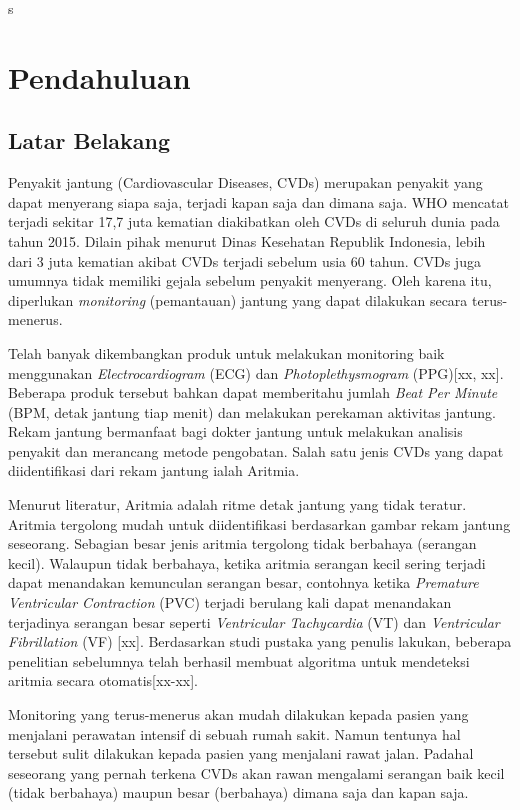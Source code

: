 s\chapter{Pendahuluan}
\section{Latar Belakang}
Penyakit jantung (Cardiovascular Diseases, CVDs) merupakan penyakit yang dapat menyerang siapa saja, terjadi kapan saja dan dimana saja. WHO mencatat terjadi sekitar 17,7 juta kematian diakibatkan oleh CVDs di seluruh dunia pada tahun 2015\cite{who2015facts}. Dilain pihak menurut Dinas Kesehatan Republik Indonesia, lebih dari 3 juta kematian akibat CVDs terjadi sebelum usia 60 tahun\cite{depkes2014}. CVDs juga umumnya tidak memiliki gejala sebelum penyakit menyerang\cite{who2015facts}. Oleh karena itu, diperlukan \textit{monitoring} (pemantauan) jantung yang dapat dilakukan secara terus-menerus.

Telah banyak dikembangkan produk untuk melakukan monitoring baik menggunakan \textit{Electrocardiogram} (ECG) dan \textit{Photoplethysmogram} (PPG)[xx, xx]. Beberapa produk tersebut bahkan dapat memberitahu jumlah \textit{Beat Per Minute} (BPM, detak jantung tiap menit) dan melakukan perekaman aktivitas jantung. Rekam jantung bermanfaat bagi dokter jantung untuk melakukan analisis penyakit dan merancang metode pengobatan. Salah satu jenis CVDs yang dapat diidentifikasi dari rekam jantung ialah Aritmia.

Menurut literatur, Aritmia adalah ritme detak jantung yang tidak teratur\cite{cvd_is}. Aritmia tergolong mudah untuk diidentifikasi berdasarkan gambar rekam jantung seseorang. Sebagian besar jenis aritmia tergolong tidak berbahaya (serangan kecil)\cite{arrhythmia_is}. Walaupun tidak berbahaya, ketika aritmia serangan kecil sering terjadi dapat menandakan kemunculan serangan besar, contohnya ketika \textit{Premature Ventricular Contraction} (PVC) terjadi berulang kali dapat menandakan terjadinya serangan besar seperti \textit{Ventricular Tachycardia} (VT) dan \textit{Ventricular Fibrillation} (VF) [xx]. Berdasarkan studi pustaka yang penulis lakukan, beberapa penelitian sebelumnya telah berhasil membuat algoritma untuk mendeteksi aritmia secara otomatis[xx-xx].

Monitoring yang terus-menerus akan mudah dilakukan kepada pasien yang menjalani perawatan intensif di sebuah rumah sakit. Namun tentunya hal tersebut sulit dilakukan kepada pasien yang menjalani rawat jalan. Padahal seseorang yang pernah terkena CVDs akan rawan mengalami serangan baik kecil (tidak berbahaya) maupun besar (berbahaya) dimana saja dan kapan saja.

